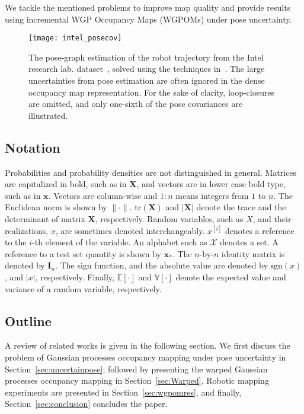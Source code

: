 \documentclass[letterpaper, 10 pt, journal, twoside]{IEEEtran}  %
\begin{document}
We tackle the mentioned problems to improve map quality and provide results using incremental WGP Occupancy Maps (WGPOMs) under pose uncertainty.

\begin{figure}
  \centering 
  \texttt{[image: intel\_posecov]}
  \caption{The pose-graph estimation of the robot trajectory from the Intel research lab. dataset~\cite{Radish_data_set}, solved using the techniques in~\cite{ila2010information,valencia2013planning}. The large uncertainties from pose estimation are often ignored in the dense occupancy map representation. For the sake of clarity, loop-closures are omitted, and only one-sixth of the pose covariances are illustrated.}
  \label{fig:intel_posecov}
\end{figure}

\subsection*{Notation}
Probabilities and probability densities are not distinguished in general. Matrices are capitalized in bold, such as in $\boldsymbol X$, and vectors are in lower case bold type, such as in $\boldsymbol x$. Vectors are column-wise and $1\colon n$ means integers from $1$ to $n$. The Euclidean norm is shown by $\lVert \cdot \rVert$. $\mathrm{tr}(\boldsymbol X)$ and $\lvert \boldsymbol X \rvert$ denote the trace and the determinant of matrix $\boldsymbol X$, respectively. Random variables, such as $X$, and their realizations, $x$, are sometimes denoted interchangeably. $x^{[i]}$ denotes a reference to the $i$-th element of the variable. An alphabet such as $\mathcal{X}$ denotes a set. A reference to a test set quantity is shown by $\boldsymbol x_*$. The $n$-by-$n$ identity matrix is denoted by $\boldsymbol I_{n}$.  The sign function, and the absolute value are denoted by $\mathrm{sgn}(x)$, and $\lvert x \rvert$, respectively. Finally, $\mathbb{E}[\cdot]$ and $\mathbb{V}[\cdot]$ denote the expected value and variance of a random variable, respectively.

\subsection*{Outline}
A review of related works is given in the following section. We first discuss the problem of Gaussian processes occupancy mapping under pose uncertainty in Section~\ref{sec:uncertainpose}; followed by presenting the warped Gaussian processes occupancy mapping in Section~\ref{sec:Warped}. Robotic mapping experiments are presented in Section~\ref{sec:wgpomres}, and finally, Section~\ref{sec:conclusion} concludes the paper.
\end{document}

